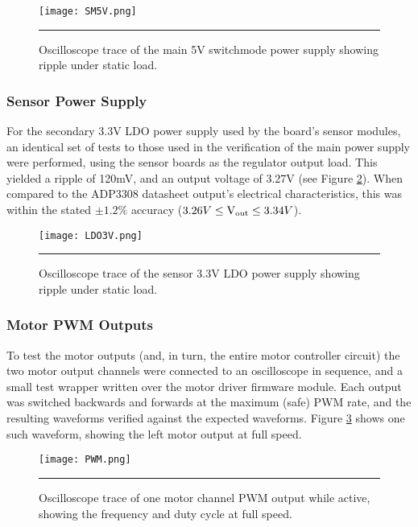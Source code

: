 \begin{figure}[tbph]
	\vspace{1em}
	\centering
		\texttt{[image: SM5V.png]}
	\rule{35em}{0.5pt}
	\caption[Switch-mode 5V power supply Oscilloscope trace]{Oscilloscope trace of the main 5V switchmode power supply showing ripple under static load.}
	\label{fig:mainpowerripple}
\end{figure}

\subsubsection{Sensor Power Supply}

For the secondary 3.3V LDO power supply used by the board's sensor modules, an identical set of tests to those used in the verification of the main power supply were performed, using the sensor boards as the regulator output load. This yielded a ripple of 120mV, and an output voltage of 3.27V (see Figure \ref{fig:sensorpowerripple}). When compared to the ADP3308 datasheet \cite{adp3308} output's electrical characteristics, this was within the stated \(\pm1.2\%\) accuracy (\(3.26V\leq\text{V\ensuremath{_{\textrm{out}}}}\leq3.34V\)).

\begin{figure}[tbph]
	\vspace{1em}
	\centering
		\texttt{[image: LDO3V.png]}
	\rule{35em}{0.5pt}
	\caption[LDO 3.3V power supply Oscilloscope trace]{Oscilloscope trace of the sensor 3.3V LDO power supply showing ripple under static load.}
	\label{fig:sensorpowerripple}
\end{figure}

\subsubsection{Motor PWM Outputs}

To test the motor outputs (and, in turn, the entire motor controller circuit) the two motor output channels were connected to an oscilloscope in sequence, and a small test wrapper written over the motor driver firmware module. Each output was switched backwards and forwards at the maximum (safe) PWM rate, and the resulting waveforms verified against the expected waveforms. Figure \ref{fig:motorpwm} shows one such waveform, showing the left motor output at full speed.

\begin{figure}[tbph]
	\vspace{1em}
	\centering
		\texttt{[image: PWM.png]}
	\rule{35em}{0.5pt}
	\caption[Motor PWM Oscilloscope trace]{Oscilloscope trace of one motor channel PWM output while active, showing the frequency and duty cycle at full speed.}
	\label{fig:motorpwm}
\end{figure}

